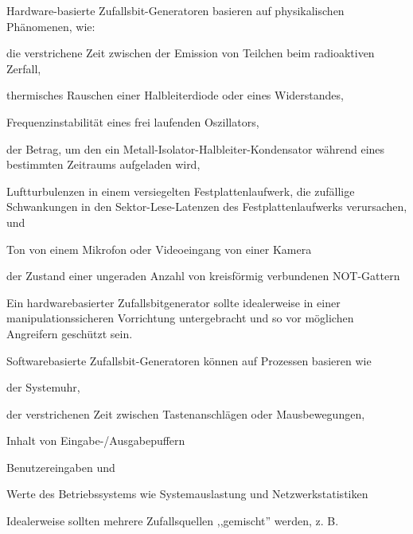 \documentclass[a4paper]{article}
\begin{document}
\begin{multicols}{3}
      \begin{itemize*}
            \item Hardware-basierte Zufallsbit-Generatoren basieren auf physikalischen
            Phänomenen, wie:
            \begin{itemize*}
                  \item die verstrichene Zeit zwischen der Emission von Teilchen beim radioaktiven Zerfall,
                  \item thermisches Rauschen einer Halbleiterdiode oder eines Widerstandes,
                  \item Frequenzinstabilität eines frei laufenden Oszillators,
                  \item der Betrag, um den ein Metall-Isolator-Halbleiter-Kondensator während eines bestimmten Zeitraums aufgeladen wird,
                  \item Luftturbulenzen in einem versiegelten Festplattenlaufwerk, die zufällige Schwankungen in den Sektor-Lese-Latenzen des Festplattenlaufwerks verursachen, und
                  \item Ton von einem Mikrofon oder Videoeingang von einer Kamera
                  \item der Zustand einer ungeraden Anzahl von kreisförmig verbundenen NOT-Gattern
            \end{itemize*}
            \item Ein hardwarebasierter Zufallsbitgenerator sollte idealerweise in einer
            manipulationssicheren Vorrichtung untergebracht und so vor möglichen
            Angreifern geschützt sein.
            \item Softwarebasierte Zufallsbit-Generatoren können auf Prozessen basieren
            wie
            \begin{itemize*}
                  \item der Systemuhr,
                  \item der verstrichenen Zeit zwischen Tastenanschlägen oder Mausbewegungen,
                  \item Inhalt von Eingabe-/Ausgabepuffern
                  \item Benutzereingaben und
                  \item Werte des Betriebssystems wie Systemauslastung und Netzwerkstatistiken
            \end{itemize*}
            \item Idealerweise sollten mehrere Zufallsquellen ,,gemischt'' werden, z. B.

\end{itemize*}
\end{multicols}
\end{document}
